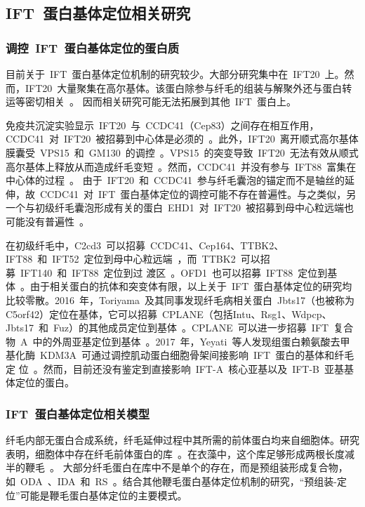 \subsection{IFT\ 蛋白基体定位相关研究}
\subsubsection{调控\ IFT\ 蛋白基体定位的蛋白质}
目前关于\ IFT\ 蛋白基体定位机制的研究较少。大部分研究集中在\ IFT20\ 上。然而，IFT20\ 大量聚集在高尔基体。该蛋白除参与纤毛的组装与解聚外还与蛋白转运等密切相关\ \citep{Follit2006,Follit2008}。 因而相关研究可能无法拓展到其他\ IFT\ 蛋白上。

免疫共沉淀实验显示\ IFT20\ 与\ CCDC41（Cep83）之间存在相互作用，CCDC41\ 对\ IFT20\ 被招募到中心体是必须的\
\citep{Joo2013}。此外，IFT20\ 离开顺式高尔基体膜囊受\ VPS15\ 和\ GM130\ 的调控\ \citep{Stoetzel2016}。VPS15\ 的突变导致\ IFT20\
无法有效从顺式高尔基体上释放从而造成纤毛变短\ \citep{Stoetzel2016}。然而，CCDC41\
并没有参与\ IFT88\
富集在中心体的过程\ \citep{Joo2013}。 由于\ IFT20\
和\ CCDC41\
参与纤毛囊泡的锚定而不是轴丝的延伸，故\ CCDC41\ 对\ IFT\
蛋白基体定位的调控可能不存在普遍性。与之类似，另一个与初级纤毛囊泡形成有关的蛋白\ EHD1\
对\ IFT20\
被招募到母中心粒远端也可能没有普遍性\ \citep{Lu2015,Naslavsky2011}。

在初级纤毛中，C2cd3\ 可以招募\ CCDC41、Cep164、TTBK2、IFT88\ 和\ IFT52\ 定位到母中心粒远端\
\citep{Ye2014,Cajanek2014}，而\ TTBK2\ 可以招募\ IFT140\ 和\ IFT88\ 定位到过
渡区\ \citep{Goetz2012,Tsang2013}。OFD1\ 也可以招募\ IFT88\ 定位到基体\ \citep{Singla2010}。由于相关蛋白的抗体和突变体有限，以上关于\ IFT\ 蛋白基体定位的研究均比较零散。2016\ 年，Toriyama\ 及其同事发现纤毛病相关蛋白\ Jbts17（也被称为C5orf42）定位在基体，它可以招募\ CPLANE（包括Intu、Rsg1、Wdpcp、Jbts17\ 和\ Fuz）的其他成员定位到基体\
\citep{Toriyama2016}。CPLANE\
可以进一步招募\ IFT\ 复合物\ A\ 中的外周亚基定位到基体\ \citep{Toriyama2016}。2017\ 年，Yeyati\ 等人发现组蛋白赖氨酸去甲基化酶\ KDM3A\ 可通过调控肌动蛋白细胞骨架间接影响\ IFT\ 蛋白的基体和纤毛定
位\ \citep{Yeyati2017}。然而，目前还没有鉴定到直接影响\ IFT-A\ 核心亚基以及\ IFT-B\ 亚基基体定位的蛋白。

\subsubsection{IFT\ 蛋白基体定位相关模型}
纤毛内部无蛋白合成系统，纤毛延伸过程中其所需的前体蛋白均来自细胞体。研究表明，细胞体中存在纤毛前体蛋白的库\ \citep{Fowkes1998,Rosenbaum1969}。在衣藻中，这个库足够形成两根长度减半的鞭毛\
\citep{Rosenbaum1969}。 大部分纤毛蛋白在库中不是单个的存在，而是预组装形成复合物，如\ ODA\  \citep{Fowkes1998}、IDA\ \citep{Piperno1997}和\ RS\ \citep{Qin2004}。结合其他鞭毛蛋白基体定位机制的研究，“预组装-定位”可能是鞭毛蛋白基体定位的主要模式。

